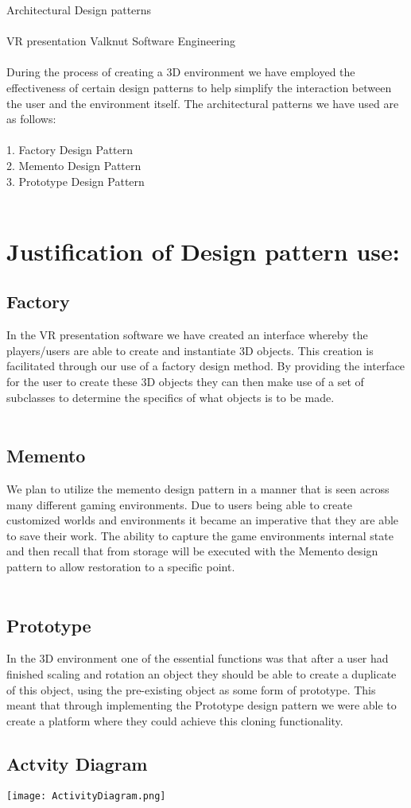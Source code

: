{\Large Architectural Design patterns} \\\\
 VR presentation Valknut Software Engineering \\\\
During the process of creating a 3D environment we have employed the effectiveness of certain design patterns to help simplify the interaction between the user and the environment itself. The architectural patterns we have used are as follows:\\\\
1.	Factory Design Pattern\\
2.	Memento Design Pattern\\
3.	Prototype Design Pattern\\\\
	\section{Justification of Design pattern use:}
	\subsection{Factory}
	In the VR presentation software we have created an interface whereby the players/users are able to create and instantiate 3D objects. This creation is facilitated through our use of a factory design method. By providing the interface for the user to create these 3D objects they can then make use of a set of subclasses to determine the specifics of what objects is to be made.\\\\
	\subsection{Memento}
	We plan to utilize the memento design pattern in a manner that is seen across many different gaming environments. Due to users being able to create customized worlds and environments it became an imperative that they are able to save their work. The ability to capture the game environments internal state and then recall that from storage will be executed with the Memento design pattern to allow restoration to a specific point.\\\\
	\subsection{Prototype}
	In the 3D environment one of the essential functions was that after a user had finished scaling and rotation an object they should be able to create a duplicate of this object, using the pre-existing object as some form of prototype. This meant that through implementing the Prototype design pattern we were able to create a platform where they could achieve this cloning functionality.
  	\subsection{Actvity Diagram}
	\texttt{[image: ActivityDiagram.png]}
